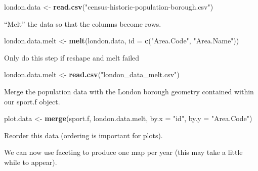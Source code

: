 \documentclass[]{article}
\newenvironment{Shaded}{}{}
\newcommand{\KeywordTok}[1]{\textcolor[rgb]{0.00,0.44,0.13}{\textbf{{#1}}}}
\newcommand{\DataTypeTok}[1]{\textcolor[rgb]{0.56,0.13,0.00}{{#1}}}
\newcommand{\StringTok}[1]{\textcolor[rgb]{0.25,0.44,0.63}{{#1}}}
\newcommand{\NormalTok}[1]{{#1}}
\begin{document}
\begin{Shaded}
\begin{Highlighting}[]
\NormalTok{london.data <- }\KeywordTok{read.csv}\NormalTok{(}\StringTok{"census-historic-population-borough.csv"}\NormalTok{)}
\end{Highlighting}
\end{Shaded}
``Melt'' the data so that the columns become rows.

\begin{Shaded}
\begin{Highlighting}[]
\NormalTok{london.data.melt <- }\KeywordTok{melt}\NormalTok{(london.data, }\DataTypeTok{id =} \KeywordTok{c}\NormalTok{(}\StringTok{"Area.Code"}\NormalTok{, }\StringTok{"Area.Name"}\NormalTok{))}
\end{Highlighting}
\end{Shaded}
Only do this step if reshape and melt failed

\begin{Shaded}
\begin{Highlighting}[]
\NormalTok{london.data.melt <- }\KeywordTok{read.csv}\NormalTok{(}\StringTok{"london_data_melt.csv"}\NormalTok{)}
\end{Highlighting}
\end{Shaded}
Merge the population data with the London borough geometry contained
within our sport.f object.

\begin{Shaded}
\begin{Highlighting}[]
\NormalTok{plot.data <- }\KeywordTok{merge}\NormalTok{(sport.f, london.data.melt, }\DataTypeTok{by.x =} \StringTok{"id"}\NormalTok{, }\DataTypeTok{by.y =} \StringTok{"Area.Code"}\NormalTok{)}
\end{Highlighting}
\end{Shaded}
Reorder this data (ordering is important for plots).

\begin{Shaded}
\end{Shaded}
We can now use faceting to produce one map per year (this may take a
little while to appear).
\end{document}
